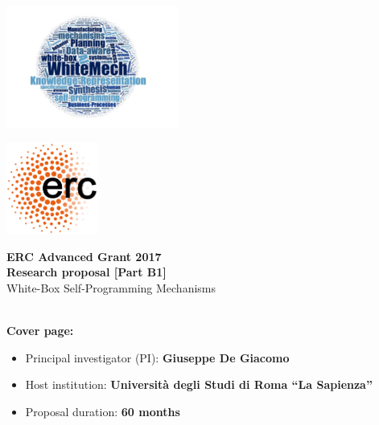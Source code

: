 \hspace{-1cm}\includegraphics[height=4cm]{images/wordcloud-1} 

\vspace{-4cm}
\hfill 
\includegraphics[height=3cm]{images/European_Research_Council_logo}

\vspace{-2cm}
\begin{center}
  \vbox{\vspace{1.5cm}}
  \Large{\textbf{%
      ERC Advanced Grant 2017\\
      Research proposal [Part B1]\\}
  }
  \vspace{1cm}
  \huge{White-Box Self-Programming Mechanisms}\\
  \vspace{1cm}
  \huge{\project}\
  \vspace{1cm}
\end{center}

\textbf{Cover page:}
\begin{itemize}
\item Principal investigator (PI): \textbf{Giuseppe De Giacomo}
\item Host institution: \textbf{Universit\`a degli Studi di Roma ``La Sapienza''}
\item Proposal duration: \textbf{60 months}
\end{itemize}
\fbox{\parbox{17cm}{}}
\vfill
\newpage

